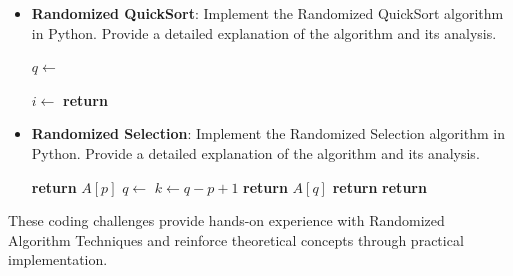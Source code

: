 \documentclass[12pt]{book} %
\begin{document}
\begin{itemize}
    \item \textbf{Randomized QuickSort}: Implement the Randomized QuickSort algorithm in Python. Provide a detailed explanation of the algorithm and its analysis.
    
\begin{algorithm}
\caption{Randomized QuickSort}
\begin{algorithmic}[1]
        \State $q \gets$ 
        \State {}
        \State {}
    \EndIf
\EndProcedure
\end{algorithmic}
\end{algorithm}

\begin{algorithm}
\caption{RandomizedPartition}
\begin{algorithmic}[1]
    \State $i \gets$ 
    \State {}
    \State \textbf{return} 
\EndProcedure
\end{algorithmic}
\end{algorithm}

    
    \item \textbf{Randomized Selection}: Implement the Randomized Selection algorithm in Python. Provide a detailed explanation of the algorithm and its analysis.
    
\begin{algorithm}
\caption{Randomized Selection}
\begin{algorithmic}[1]
        \State \textbf{return} $A[p]$
    \EndIf
    \State $q \gets$ 
    \State $k \gets q - p + 1$
        \State \textbf{return} $A[q]$
        \State \textbf{return} 
    \Else
        \State \textbf{return} 
    \EndIf
\EndProcedure
\end{algorithmic}
\end{algorithm}

    \FloatBarrier
    
\end{itemize}

These coding challenges provide hands-on experience with Randomized Algorithm Techniques and reinforce theoretical concepts through practical implementation.
\end{document}
